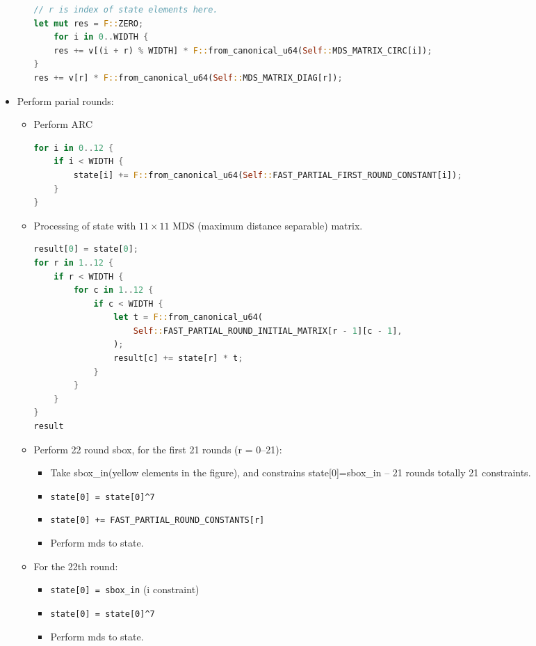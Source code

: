 \begin{itemize}
\begin{itemize}
        \begin{lstlisting}[language=rust]
// r is index of state elements here.
let mut res = F::ZERO;
    for i in 0..WIDTH {
    res += v[(i + r) % WIDTH] * F::from_canonical_u64(Self::MDS_MATRIX_CIRC[i]);
}
res += v[r] * F::from_canonical_u64(Self::MDS_MATRIX_DIAG[r]);
        \end{lstlisting}
    \end{itemize}
    \item Perform parial rounds:
    \begin{itemize}
        \item Perform ARC
        \begin{lstlisting}[language=rust]
for i in 0..12 {
    if i < WIDTH {
        state[i] += F::from_canonical_u64(Self::FAST_PARTIAL_FIRST_ROUND_CONSTANT[i]);
    }
}
        \end{lstlisting}
        \item Processing of state with $11 \times 11$ MDS (maximum distance separable) matrix.
        \begin{lstlisting}[language=rust]
result[0] = state[0];
for r in 1..12 {
    if r < WIDTH {
        for c in 1..12 {
            if c < WIDTH {
                let t = F::from_canonical_u64(
                    Self::FAST_PARTIAL_ROUND_INITIAL_MATRIX[r - 1][c - 1],
                );
                result[c] += state[r] * t;
            }
        }
    }
}
result
        \end{lstlisting}
        \item Perform 22 round sbox, for the first 21 rounds (r = 0--21):
        \begin{itemize}
            \item Take sbox\_in(yellow elements in the figure), and constrains state[0]=sbox\_in -- 21 rounds totally 21 constraints.
            \item \verb|state[0] = state[0]^7|
            \item \verb|state[0] += FAST_PARTIAL_ROUND_CONSTANTS[r]|
            \item Perform mds to state.
        \end{itemize}
        \item For the 22th round:
        \begin{itemize}
            \item \verb|state[0] = sbox_in| (i constraint)
            \item \verb|state[0] = state[0]^7|
            \item Perform mds to state.

\end{itemize}
\end{itemize}
\end{itemize}
